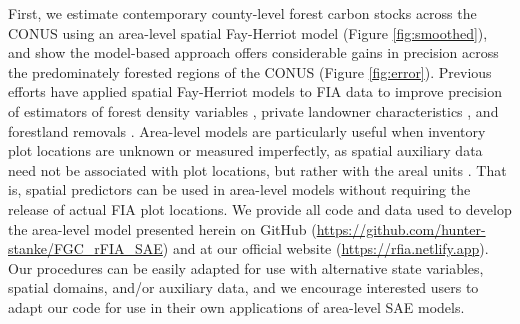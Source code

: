 \documentclass[11pt]{article}
\begin{document}
First, we estimate contemporary county-level forest carbon stocks across the CONUS using an area-level spatial Fay-Herriot model (Figure \ref{fig:smoothed}), and show the model-based approach offers considerable gains in precision across the predominately forested regions of the CONUS (Figure \ref{fig:error}). Previous efforts have applied spatial Fay-Herriot models to FIA data to improve precision of estimators of forest density variables \citep{goerndt2011comparison}, private landowner characteristics \citep{ver2017hierarchical}, and forestland removals \citep{coulston2021enhancing}. Area-level models are particularly useful when inventory plot locations are unknown or measured imperfectly, as spatial auxiliary data need not be associated with plot locations, but rather with the areal units \citep{rao2015small, mauro2017analysis}. That is, spatial predictors can be used in area-level models without requiring the release of actual FIA plot locations. We provide all code and data used to develop the area-level model presented herein on GitHub (\url{https://github.com/hunter-stanke/FGC_rFIA_SAE}) and at our official website (\url{https://rfia.netlify.app}). Our procedures can be easily adapted for use with alternative state variables, spatial domains, and/or auxiliary data, and we encourage interested users to adapt our code for use in their own applications of area-level SAE models.
\end{document}
